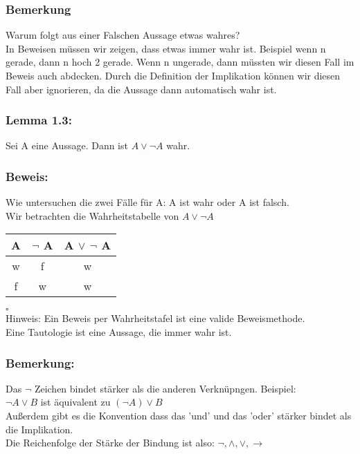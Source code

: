 \documentclass{article}
\begin{document}
\subsubsection*{Bemerkung}
Warum folgt aus einer Falschen Aussage etwas wahres? \\
In Beweisen müssen wir zeigen, dass etwas immer wahr ist. Beispiel wenn n gerade, dann n hoch 2 gerade. Wenn n ungerade, dann müssten wir diesen Fall im Beweis auch abdecken. Durch die Definition der Implikation können wir diesen Fall aber ignorieren, da die Aussage dann automatisch wahr ist. \\

\subsubsection*{Lemma 1.3:}
Sei A eine Aussage. Dann ist $A \vee \neg A$ wahr.\\

\subsubsection*{Beweis:}
Wie untersuchen die zwei Fälle für A: A ist wahr oder A ist falsch. \\
Wir betrachten die Wahrheitstabelle von $A \vee \neg A$ \\
\begin{center}
    \begin{tabular}{|c|c|c|}
        \hline
        A & $\neg$ A & A $\vee$ $\neg$ A \\
        \hline
        \hline
        w & f & w \\
        f & w & w \\
        \hline
    \end{tabular}
\end{center} $\square$ \\

Hinweis: Ein Beweis per Wahrheitstafel ist eine valide Beweismethode. \\
Eine Tautologie ist eine Aussage, die immer wahr ist. \\

\subsubsection*{Bemerkung:}
Das $\neg$ Zeichen bindet stärker als die anderen Verknüpngen. Beispiel: \\
$\neg A \vee B$ ist äquivalent zu $(\neg A) \vee B$ \\
Außerdem gibt es die Konvention dass das 'und' und das 'oder' stärker bindet als die Implikation. \\
Die Reichenfolge der Stärke der Bindung ist also: $\neg, \wedge, \vee, \rightarrow$ \\
\end{document}
